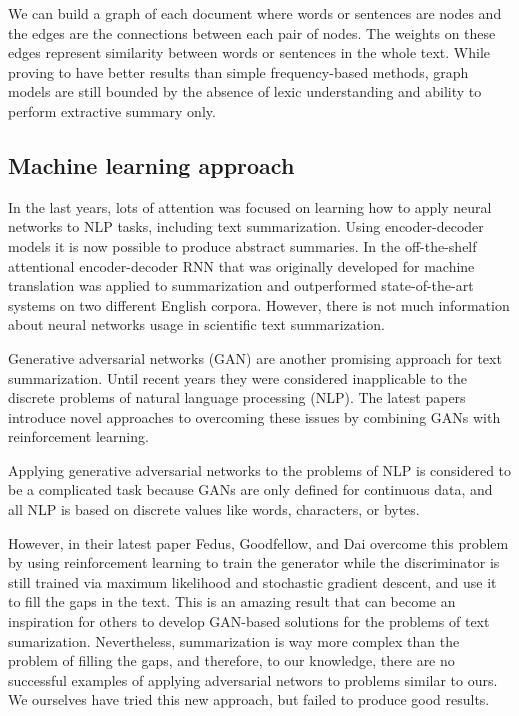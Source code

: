 \documentclass[sigplan]{acmart}
\begin{document}
We can build a graph of each document where words or sentences are nodes and the edges are the connections between each pair of nodes. The weights on these edges represent similarity between words or sentences in the whole text. While proving to have better results than simple frequency-based methods, graph models are still bounded by the absence of lexic understanding and ability to perform extractive summary only.

\subsection{Machine learning approach}
\label{sec:ml}

In the last years, lots of attention was focused on learning how to apply neural networks to NLP tasks, including text summarization. Using encoder-decoder models it is now possible to produce abstract summaries. In \cite{nallapati-16} the off-the-shelf attentional encoder-decoder RNN that was originally developed for machine translation was applied to summarization and outperformed state-of-the-art systems on two different English corpora. However, there is not much information about neural networks usage in scientific text summarization.

Generative adversarial networks (GAN) are another promising approach for text summarization. Until recent years they were considered inapplicable to the discrete problems of natural language processing (NLP). The latest papers introduce novel approaches to overcoming these issues by combining GANs with reinforcement learning.

Applying generative adversarial networks to the problems of NLP is considered to be a complicated task because GANs are only defined for continuous data, and all NLP is based on discrete values like words, characters, or bytes.

However, in their latest paper Fedus, Goodfellow, and Dai\cite{fedus-18} overcome this problem by using reinforcement learning to train the generator while the discriminator is still trained via maximum likelihood and stochastic gradient descent, and use it to fill the gaps in the text. This is an amazing result that can become an inspiration for others to develop GAN-based solutions for the problems of text sumarization. Nevertheless, summarization is way more complex than the problem of filling the gaps, and therefore, to our knowledge, there are no successful examples of applying adversarial networs to problems similar to ours. We ourselves have tried this new approach, but failed to produce good results.
\end{document}
